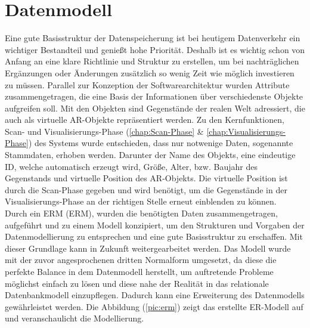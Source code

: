 \section{Datenmodell}
\label{chap:Datenmodell}
Eine gute Basisstruktur der Datenspeicherung ist bei heutigem Datenverkehr ein wichtiger Bestandteil und genießt hohe Priorität. Deshalb ist 
es wichtig schon von Anfang an eine klare Richtlinie und Struktur zu erstellen, um bei nachträglichen Ergänzungen oder Änderungen zusätzlich so wenig 
Zeit wie möglich investieren zu müssen. Parallel zur Konzeption der Softwarearchitektur wurden Attribute zusammengetragen, die 
eine Basis der Informationen über verschiedenste Objekte aufgreifen soll. Mit den Objekten sind Gegenstände der realen Welt adressiert, die auch als 
virtuelle \acs{AR}-Objekte repräsentiert werden. Zu den Kernfunktionen, Scan- und Visualisierungs-Phase (\ref{chap:Scan-Phase} \& 
\ref{chap:Visualisierungs-Phase}) des Systems wurde entschieden, dass nur notwenige Daten, sogenannte Stammdaten, erhoben werden. Darunter 
der Name des Objekts, eine eindeutige ID, welche automatisch erzeugt wird, Größe, Alter, bzw. Baujahr des Gegenstands und virtuelle Position 
des \acs{AR}-Objekts. Die virtuelle Position ist durch die Scan-Phase gegeben und wird benötigt, um die Gegenstände in der 
Visualisierungs-Phase an der richtigen Stelle erneut einblenden zu können. 
\\ 
\linebreak 
Durch ein \acl{ERM} (\acs{ERM}), wurden die benötigten Daten zusammengetragen, aufgeführt und zu einem Modell konzipiert, um den Strukturen und 
Vorgaben der Datenmodellierung zu entsprechen und eine gute Basisstruktur zu erschaffen. Mit dieser Grundlage kann in Zukunft weitergearbeitet werden. 
Das Modell wurde mit der zuvor angesprochenen dritten Normalform umgesetzt, da diese die perfekte Balance in dem Datenmodell herstellt, um auftretende 
Probleme möglichst einfach zu lösen und diese nahe der Realität in das relationale Datenbankmodell einzupflegen. Dadurch kann eine Erweiterung des 
Datenmodells gewährleistet werden. Die Abbildung (\ref{pic:erm}) zeigt das erstellte ER-Modell auf und veranschaulicht die Modellierung. 
\\ 
\pagebreak
